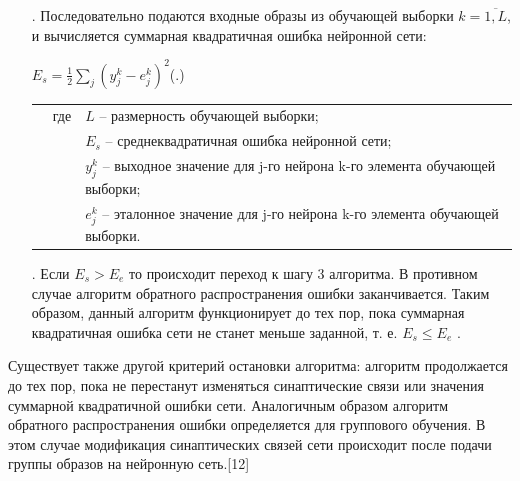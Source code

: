 {\begin{itemize}[leftmargin=2.15cm, labelwidth=0.65cm, labelsep=0.0cm]
\begin{itemize}[leftmargin=1.5cm, labelwidth=0.65cm, labelsep=0.0cm]
		\end{itemize}
		
		\addtocounter{itemcntr}{1}
		
		\item[\theitemcntr. ] Последовательно подаются входные образы из обучающей выборки $k = \overline{1,L}$, и вычисляется суммарная квадратичная ошибка нейронной сети:
		
		\formulaspace \par \redline 
		$E_{s} = \frac{1}{2} \sum \limits _{j}^{} (y_{j}^{k} - e_{j}^{k})^{2} $\hfill (\thechaptercntr .\theformulacntr) \redline
		\formulaspace \addtocounter{formulacntr}{1}
		
		\begin{tabular}{p{}p{}p{}}
			& где  & $ L $ {--} размерность обучающей выборки;\\
			&      & $ E_s $ {--} среднеквадратичная ошибка нейронной сети;\\
			&      & $y_{j}^{k}$ {--} выходное значение для j-го нейрона k-го элемента обучающей выборки; \\
			&      & $e_{j}^{k}$ {--} эталонное значение для j-го нейрона k-го элемента обучающей выборки. \\
		\end{tabular}
		
		\addtocounter{itemcntr}{1}
		
		
		\item[\theitemcntr. ] Если $E_s > E_e$ то происходит переход к шагу 3 алгоритма. В противном случае алгоритм обратного распространения ошибки заканчивается. Таким образом, данный алгоритм функционирует до тех пор, пока суммарная квадратичная ошибка сети не станет меньше заданной, т. е. $E_s \leq E_e$ .
		
		\addtocounter{itemcntr}{1}
		
		\setcounter{itemcntr}{1}
	\end{itemize}
	
	\par \redline Существует также другой критерий остановки алгоритма: алгоритм	продолжается до тех пор, пока не перестанут изменяться синаптические связи или значения суммарной квадратичной ошибки сети. Аналогичным образом алгоритм обратного распространения ошибки определяется для группового обучения. В этом случае модификация синаптических связей сети происходит после подачи группы образов на нейронную сеть.[12]
	
	\par
}

